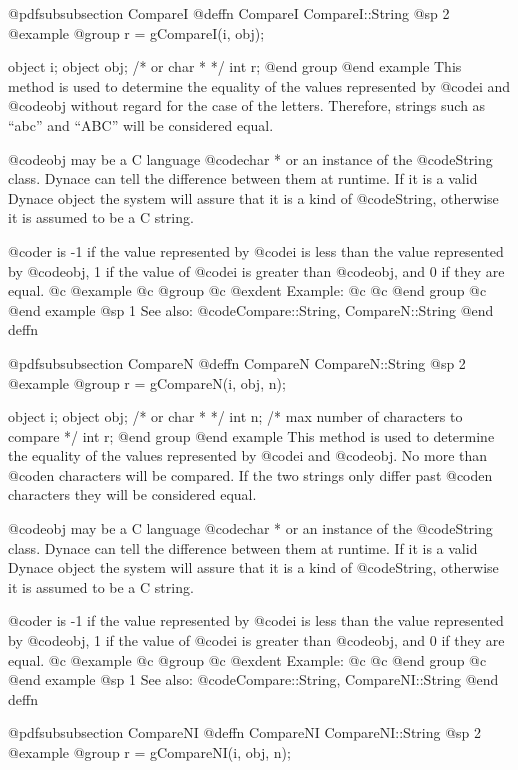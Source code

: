 @pdfsubsubsection {CompareI}
@deffn {CompareI} CompareI::String
@sp 2
@example
@group
r = gCompareI(i, obj);

object  i;
object  obj;  /*  or char *  */
int     r;
@end group
@end example
This method is used to determine the equality of the values represented
by @code{i} and @code{obj} without regard for the case of the letters.
Therefore, strings such as ``abc'' and ``ABC'' will be considered equal.

@code{obj} may be a C language @code{char *} or an instance of the
@code{String} class.  Dynace can tell the difference between them at
runtime.  If it is a valid Dynace object the system will assure that it is
a kind of @code{String}, otherwise it is assumed to be a C string.

@code{r} is -1 if the value represented by @code{i} is less than the
value represented by @code{obj}, 1 if the value of @code{i} is greater
than @code{obj}, and 0 if they are equal.
@c @example
@c @group
@c @exdent Example:
@c
@c @end group
@c @end example
@sp 1
See also:  @code{Compare::String, CompareN::String}
@end deffn






@pdfsubsubsection {CompareN}
@deffn {CompareN} CompareN::String
@sp 2
@example
@group
r = gCompareN(i, obj, n);

object  i;
object  obj;  /*  or char *  */
int     n;    /*  max number of characters to compare  */
int     r;
@end group
@end example
This method is used to determine the equality of the values represented
by @code{i} and @code{obj}.  No more than @code{n} characters will be
compared. If the two strings only differ past @code{n} characters they
will be considered equal.


@code{obj} may be a C language @code{char *} or an instance of the
@code{String} class.  Dynace can tell the difference between them at
runtime.  If it is a valid Dynace object the system will assure that it is
a kind of @code{String}, otherwise it is assumed to be a C string.

@code{r} is -1 if the value represented by @code{i} is less than the
value represented by @code{obj}, 1 if the value of @code{i} is greater
than @code{obj}, and 0 if they are equal.
@c @example
@c @group
@c @exdent Example:
@c
@c @end group
@c @end example
@sp 1
See also:  @code{Compare::String, CompareNI::String}
@end deffn





@pdfsubsubsection {CompareNI}
@deffn {CompareNI} CompareNI::String
@sp 2
@example
@group
r = gCompareNI(i, obj, n);

